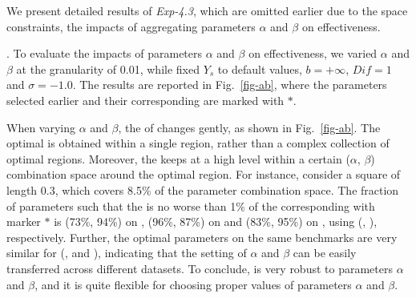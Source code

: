 We present detailed results of {\em Exp-4.3}, which are omitted earlier due to the space constraints, \ie the impacts of aggregating parameters $\alpha$ and $\beta$ on effectiveness.


.
To evaluate the impacts of parameters $\alpha$ and $\beta$ on effectiveness, we varied $\alpha$ and $\beta$ at the granularity of 0.01, while fixed $Y_s$ to default values, $b=+\infty$, $Dif=1$ and $\sigma=-1.0$. The results are reported in Fig.~\ref{fig-ab}, where the parameters selected earlier and their corresponding \PairAcc are marked with $*$.

When varying $\alpha$ and $\beta$, the \PairAcc of \ensemblerank changes gently, as shown in Fig.~\ref{fig-ab}.
The optimal \PairAcc is obtained within a single region, rather than a complex collection of optimal regions.
%
Moreover, the \PairAcc keeps at a high level within a certain ($\alpha$, $\beta$) combination space around the optimal region.
For instance, consider a square of length 0.3, which covers 8.5\% of the parameter combination space. The fraction of parameters such that the \PairAcc is no worse than 1\% of the corresponding \PairAcc with marker $*$ is (73\%, 94\%) on \aan, (96\%, 87\%) on \aminer and (83\%, 95\%) on \magdata, using (\recom, \fcita), respectively.
%
Further, the optimal parameters on the same benchmarks are very similar for (\aan, \aminer and \magdata), indicating that the setting of $\alpha$ and $\beta$ can be easily transferred across different datasets.
To conclude, \ensemblerank is very robust to parameters $\alpha$ and $\beta$, and it is quite flexible for choosing proper values of parameters $\alpha$ and $\beta$.


